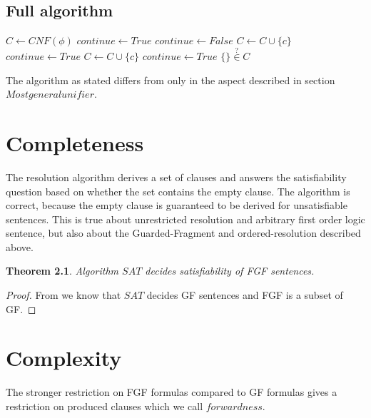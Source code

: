 \documentclass[english, shortabstract]{iithesis}
\theoremstyle{definition} \newtheorem{definition}{Definition}[chapter]
\theoremstyle{remark} \newtheorem{remark}[definition]{Observation}
\theoremstyle{plain} \newtheorem{theorem}[definition]{Theorem}
\theoremstyle{plain} \newtheorem{lemma}[definition]{Lemma}
\begin{document}
\section{Full algorithm}

\begin{algorithm}
\begin{algorithmic}
\State $C \gets CNF(\phi)$
\State $continue \gets True$
\State $continue \gets False$
    \State $C \gets C \cup \{c\}$
    \State $continue \gets True$
\EndIf
{}
    \State $C \gets C \cup \{c\}$
    \State $continue \gets True$
\EndIf
\EndFor
\EndWhile
\State
\Return $\{\} \stackrel{?}{\in} C$
\EndProcedure
\end{algorithmic}
\end{algorithm}

The algorithm as stated differs from \cite{resolution GF} only in the aspect described in section $\mathit{Most general unifier}$.

\chapter{Completeness}

The resolution algorithm derives a set of clauses and answers the satisfiability question 
based on whether the set contains the empty clause. The algorithm is correct, because 
the empty clause is guaranteed to be derived for unsatisfiable sentences.
This is true about unrestricted resolution and arbitrary first order logic sentence, 
but also about the Guarded-Fragment and ordered-resolution described above.

\begin{theorem}
Algorithm $SAT$ decides satisfiability of FGF sentences.
\end{theorem}

\begin{proof}
From \cite{resolution gf} we know that $SAT$ decides GF sentences and FGF is a subset of GF.
\end{proof}

\chapter{Complexity}

The stronger restriction on FGF formulas compared to GF formulas gives a restriction on produced clauses which we call $forwardness$.
\end{document}
